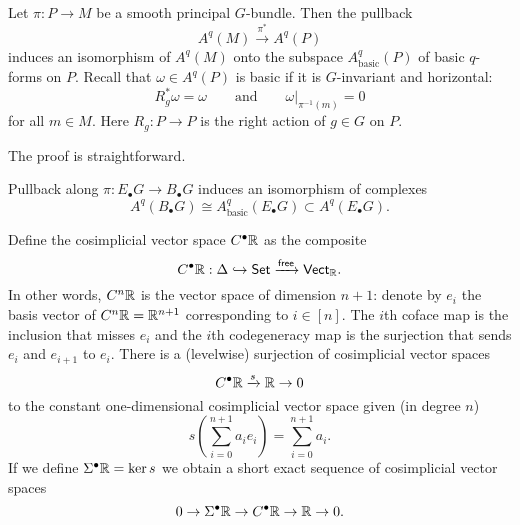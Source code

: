 \documentclass{amsart}
\begin{document}
\begin{proposition}
    Let $\pi: P\to M$ be a smooth principal $G$-bundle. Then the pullback 
    \begin{equation*}
        A^q(M) \xrightarrow{\pi^*} A^q(P)
    \end{equation*}
    induces an isomorphism of $A^q(M)$ onto the subspace $A^q_\text{basic}(P)$ 
    of basic $q$-forms on $P$. Recall that $\omega\in A^q(P)$ is basic if it is 
    $G$-invariant and horizontal:
    \begin{equation*}
        R_g^*\omega = \omega \qquad \text{and} \qquad \omega|_{\pi^{-1}(m)}=0
    \end{equation*}
    for all $m\in M$. Here $R_g: P\to P$ is the right action of $g\in G$ on $P$.
\end{proposition}
The proof is straightforward.

\begin{corollary}
    Pullback along $\pi: E_\bullet G \to B_\bullet G$ induces an isomorphism
    of complexes
    \begin{equation*}
        A^q(B_\bullet G) \cong A^q_\text{basic}(E_\bullet G) \subset 
        A^q(E_\bullet G).
    \end{equation*}
\end{corollary}

\begin{definition}
    Define the cosimplicial vector space $C^\bullet\mathbb{R}$ as the composite
    \begin{equation*}
        C^\bullet\mathbb{R} : \Delta \hookrightarrow \mathsf{Set} 
        \xrightarrow{\mathsf{free}} \mathsf{Vect}_{\mathbb{R}}.
    \end{equation*}
    In other words, $C^n\mathbb{R}$ is the vector space of dimension $n+1$: denote by  
    $e_i$ the basis vector of $C^n\mathbb{R}=\mathbb{R}^{n+1}$ corresponding to $i\in [n]$. The 
    $i$th coface map is the inclusion that misses $e_i$ and the $i$th 
    codegeneracy map is the surjection that sends $e_i$ and $e_{i+1}$ to $e_i$.
    There is a (levelwise) surjection of cosimplicial vector spaces
    \begin{equation*}
        C^\bullet \mathbb{R} \xrightarrow{s} \mathbb{R} \to 0
    \end{equation*}
    to the constant one-dimensional cosimplicial vector space given (in degree 
    $n$)
    \begin{equation*}
        s\left( \sum_{i=0}^{n+1} a_i e_i \right) = \sum_{i=0}^{n+1} a_i.
    \end{equation*}
    If we define $\Sigma^\bullet \mathbb{R}=\ker s$ we obtain a short exact sequence of 
    cosimplicial vector spaces
    \begin{equation*}
        0 \to \Sigma^\bullet \mathbb{R} \to C^\bullet \mathbb{R} \to \mathbb{R} \to 0.
    \end{equation*}
\end{definition}
\end{document}
